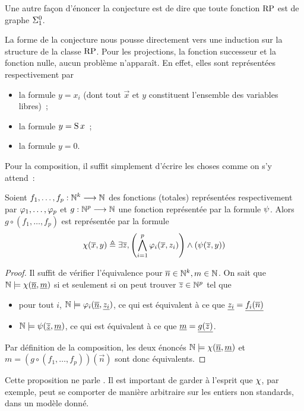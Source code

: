 Une autre façon d'énoncer la conjecture est de dire que toute fonction $\operatorname{RP}$
est de graphe $\Sigma^0_{1}$.

La forme de la conjecture nous pousse directement vers une induction sur la
structure de la classe $\operatorname{RP}$. Pour les projections, la fonction successeur et
la fonction nulle, aucun problème n'apparaît. En effet,
elles sont représentées respectivement par
\begin{itemize}
\item la formule $y = x_i$ (dont tout $\vec x$ et $y$ constituent l'ensemble des
  variables libres)~;
\item la formule $y = \operatorname{S} x$~;
\item la formule $y = 0$.
\end{itemize}

Pour la composition, il suffit simplement d'écrire les choses comme on s'y
attend~:

\begin{proposition}
  Soient $f_1,\ldots,f_p : \displaystyle \mathbb N^k \longrightarrow \mathbb N$ des fonctions (totales)
  représentées respectivement par $\varphi_1,\ldots,\varphi_p$ et
  $g : \displaystyle \mathbb N^p \longrightarrow \mathbb N$ une fonction représentée par la formule
  $\psi$.
  Alors $g\circ (f_1,\ldots,f_p)$ est représentée par la formule
  \[\chi(\overline{x}, y) \triangleq \exists \overline{z},
  \left(\bigwedge_{i = 1}^p \varphi_i(\overline{x}, z_i)\right) \land
  (\psi(\overline{z}, y))\]
\end{proposition}

\begin{proof}
  Il suffit de vérifier l'équivalence pour $\overline{n} \in \mathbb N^k, m \in \mathbb N$.
  On sait que $\mathbb N\models \chi(\underline{\overline{n}}, \underline{m})$ si et
  seulement si on peut trouver $\overline{z} \in \mathbb N^p$ tel que
  \begin{itemize}
  \item pour tout $i$, $\mathbb N\models \varphi_i(\underline{\overline{n}}, \underline{z_i})$,
    ce qui est équivalent à ce que $\underline{z_i} = \underline{f_i(\overline{n})}$
  \item $\mathbb N\models\psi(\underline{\overline{z}}, \underline{m})$, ce qui est équivalent à
    ce que $\underline{m} = \underline{g(\overline{z})}$.
  \end{itemize}
  Par définition de la composition, les deux énoncés
  $\mathbb N\models \chi(\underline{\overline{n}},\underline{m})$
  et $m = (g\circ(f_1,\ldots,f_p)) (\vec n)$ sont donc équivalents.
\end{proof}

\begin{remark}
  Cette proposition ne parle . Il est
  important de garder à l'esprit que $\chi$, par exemple, peut se comporter
  de manière arbitraire sur les entiers non standards, dans un modèle donné.
\end{remark}

